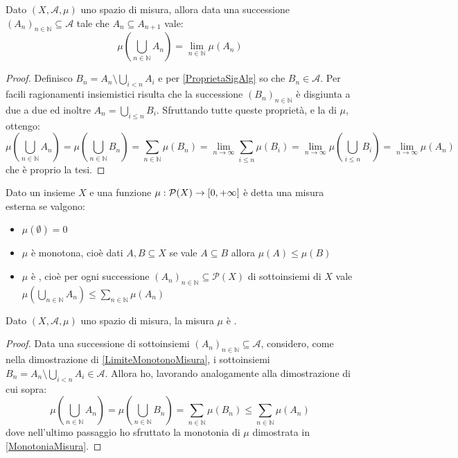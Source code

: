 \begin{proposition}\label{LimiteMonotonoMisura}
	Dato $(X,\mathcal A,\mu)$ uno spazio di misura, allora data una successione $(A_n)_{n\in\mathbb N}\subseteq \mathcal A$ tale che $A_n\subseteq A_{n+1}$ vale:
	\begin{equation*}
		\mu\left(\bigcup_{n\in\mathbb N} A_n\right)=\lim_{n\in\mathbb N} \mu(A_n)
	\end{equation*}
\end{proposition}
\begin{proof}
	Definisco $B_n=A_n\setminus\bigcup_{i<n}A_i$ e per \cref{ProprietaSigAlg} so che $B_n\in\mathcal A$.
	Per facili ragionamenti insiemistici risulta che la successione $(B_n)_{n\in\mathbb N}$ è disgiunta a due a due ed inoltre $A_n=\bigcup_{i\le n}B_i$.
	Sfruttando tutte queste proprietà, e la \sigadd[ità] di $\mu$, ottengo:
	\begin{equation*}
		\mu\left(\bigcup_{n\in\mathbb N} A_n\right)=\mu\left(\bigcup_{n\in\mathbb N} B_n\right)=
		\sum_{n\in\mathbb N} \mu(B_n)=\lim_{n\to\infty} \sum_{i\le n} \mu(B_i)=
		\lim_{n\to\infty} \mu\left(\bigcup_{i\le n} B_i\right)=\lim_{n\to\infty} \mu(A_n)
	\end{equation*}
	che è proprio la tesi.
\end{proof}

\begin{definition}
	Dato un insieme $X$ e una funzione $\mu:\mathcal P(X)\to [0,+\infty]$ è detta una misura esterna se valgono:
	\begin{itemize}
		\item $\mu(\emptyset)=0$
		\item $\mu$ è monotona, cioè dati $A,B\subseteq X$ se vale $A\subseteq B$ allora $\mu(A)\le \mu(B)$
		\item $\mu$ è \sigsubadd{}, cioè  per ogni successione $(A_n)_{n\in\mathbb N}\subseteq \mathcal P(X)$ di sottoinsiemi di $X$ vale $\mu\left(\bigcup_{n\in\mathbb{N}}A_n\right)\le \sum_{n\in\mathbb N} \mu(A_n)$
	\end{itemize}
\end{definition}

\begin{remark}
	Dato $(X,\mathcal A,\mu)$ uno spazio di misura, la misura $\mu$ è \sigsubadd{}.
\end{remark}
\begin{proof}
	Data una successione di sottoinsiemi $(A_n)_{n\in\mathbb N}\subseteq \mathcal A$, considero, come nella dimostrazione di \cref{LimiteMonotonoMisura}, i sottoinsiemi $B_n=A_n\setminus\bigcup_{i<n}A_i\in\mathcal A$.
	Allora ho, lavorando analogamente alla dimostrazione di cui sopra:
	\begin{equation*}
		\mu\left(\bigcup_{n\in\mathbb N} A_n\right)=\mu\left(\bigcup_{n\in\mathbb N} B_n\right)=
		\sum_{n\in\mathbb N} \mu(B_n)\le \sum_{n\in\mathbb N} \mu(A_n)
	\end{equation*}
	dove nell'ultimo passaggio ho sfruttato la monotonia di $\mu$ dimostrata in \cref{MonotoniaMisura}.
\end{proof}

